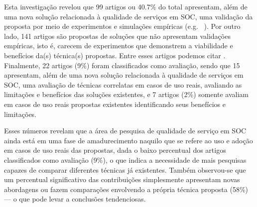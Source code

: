 Esta investiga\c c\~{a}o revelou que 99 artigos ou 40.7\% do total apresentam, al\'{e}m de uma nova solu\c c\~{a}o relacionada \`{a} qualidade de servi\c cos em SOC, uma validação da proposta por meio de experimentos e simulações empíricas (e.g.  ~\cite{jeong:fqs2009,ardagna:jss2010,huang:scc2011,binshtok:icsoc2009}). Por outro lado, 141 artigos s\~{a}o propostas de solu\c c\~{o}es que não apresentam validações empíricas, isto é, carecem de experimentos que demonstrem a viabilidade e benefícios da(s) técnica(s) propostas. Entre esses artigos podemos citar \cite{filieri:faa2012,nascimento:splc2011,balfagih:icime2011,Clark:2009}. Finalmente, 22 artigos (9\%) foram classificados como avaliação, sendo que 15 apresentam, al\'{e}m de uma nova solu\c c\~{a}o relacionada \`{a} qualidade de servi\c cos em SOC, uma avaliação de técnicas correlatas em casos de uso reais, avaliando as limitações e benefícios das soluções existentes, e 7 artigos (2\%) somente avaliam em casos de uso reais propostas existentes identificando seus benefícios e limitações.

Esses n\'{u}meros revelam que a \'{a}rea de pesquisa de qualidade de servi\c co em SOC ainda est\'{a} em uma fase de amadurecimento naquilo que se refere ao uso e adoção em casos de uso reais das propostas, dada o baixo percentual dos artigos classificados como avaliação (9\%), o que indica a necessidade de mais pesquisas capazes de comparar diferentes técnicas já existentes. Também observou-se que um percentual significativo das contribui\c c\~{o}es simplesmente apresentam novas abordagens ou fazem compara\c c\~{o}es envolvendo a pr\'{o}pria t\'{e}cnica proposta (58\%) --- o que pode levar a conclus\~{o}es tendenciosas. 